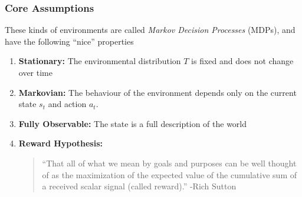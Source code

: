 \documentclass[10pt,a4paper]{beamer}
\begin{document}
\begin{frame}
\frametitle{Core Assumptions}

These kinds of environments are called \textit{Markov Decision Processes} (MDPs),
and have the following ``nice'' properties
\begin{enumerate}
	\pause
		\item \textbf{Stationary:} The environmental distribution $T$
		is fixed and does not change over time
		\pause
		\item \textbf{Markovian:} The behaviour of the environment
		depends only on the current state $s_t$
		and action $a_t$. 
	\pause
		\item \textbf{Fully Observable:} The state is a full description
		of the world
	\pause
		\item \textbf{Reward Hypothesis:} 
		\begin{quote}
			``That all of what we mean by goals and purposes can be well thought of as
			the maximization of the expected value of the cumulative sum of a received
			scalar signal (called reward).'' -Rich Sutton
		\end{quote}
\end{enumerate}

\end{frame}
\end{document}
